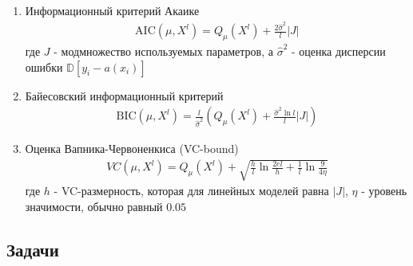 \begin{enumerate}
    \item Информационный критерий Акаике 
        \begin{align*}
            \text{AIC}(\mu, X^l) = Q_{\mu}(X^l) + \frac{2\hat{\sigma}^2}{l}|J|
        \end{align*}
        где $J$ - модмножество используемых параметров, а $\hat{\sigma}^2$ - оценка дисперсии ошибки $\mathbb{D}[y_i - a(x_i)]$ 
    \item Байесовский информационный критерий
        \begin{align*}
            \text{BIC}(\mu, X^l) = \frac{l}{\hat{\sigma}^2}\left(Q_{\mu}(X^l) + \frac{\hat{\sigma}^2\ln{l}}{l}|J|\right)
        \end{align*}
    \item Оценка Вапника-Червоненкиса (VC-bound)
        \begin{align*}
            VC(\mu, X^l) = Q_{\mu}(X^l) + \sqrt{\frac{h}{l}\ln{\frac{2el}{h}} + \frac{1}{l}\ln{\frac{9}{4\eta}}}
        \end{align*}
        где $h$ - VC-размерность, которая для линейных моделей равна $|J|$, $\eta$ - уровень значимости, обычно равный $0.05$
\end{enumerate}

\subsection*{Задачи}

